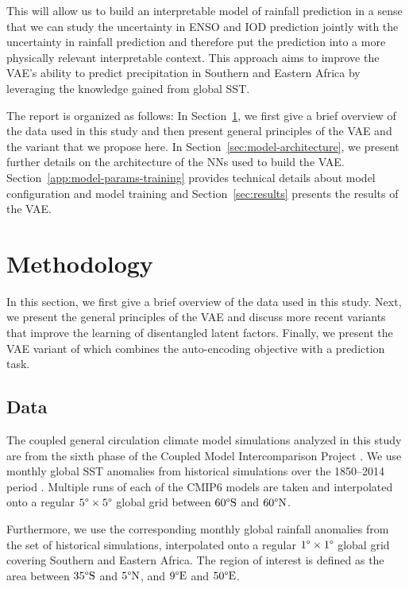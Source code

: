 \documentclass[english,a4paper,10pt]{scrartcl}
\newcommand{\degr}[1]{\text{\textdegree #1}}
\begin{document}
This will allow us to build an interpretable model of rainfall prediction in a sense that we can study the uncertainty in ENSO and IOD prediction jointly with the uncertainty in rainfall prediction and therefore put the prediction into a more physically relevant interpretable context. This approach aims to improve the VAE's ability to predict precipitation in Southern and Eastern Africa by leveraging the knowledge gained from global SST.

The report is organized as follows: In Section~\ref{sec:methodology}, we first give a brief overview of the data used in this study and then present general principles of the VAE and the variant that we propose here. In Section~\ref{sec:model-architecture}, we present further details on the architecture of the NNs used to build the VAE. Section~\ref{app:model-params-training} provides technical details about model configuration and model training and Section~\ref{sec:results} presents the results of the VAE.

\section{Methodology}\label{sec:methodology}

In this section, we first give a brief overview of the data used in this study. Next, we present the general principles of the VAE and discuss more recent variants that improve the learning of disentangled latent factors. Finally, we present the VAE variant of \cite{Groth.Chavez.2023} which combines the auto-encoding objective with a prediction task.

\subsection{Data}\label{sec:data}

The coupled general circulation climate model simulations analyzed in this study are from the sixth phase of the Coupled Model Intercomparison Project \citep[CMIP6,][]{Flynn.Mauritsen.2020}. We use monthly global SST anomalies from historical simulations over the 1850--2014 period . Multiple runs of each of the CMIP6 models are taken and interpolated onto a regular $5\degr{}\times5\degr{}$ global grid between $60\degr{S}$ and $60\degr{N}$.

Furthermore, we use the corresponding monthly global rainfall anomalies from the set of historical simulations, interpolated onto a regular $1\degr{}\times1\degr{}$ global grid covering Southern and Eastern Africa. The region of interest is defined as the area between $35\degr{S}$ and $5\degr{N}$, and $9\degr{E}$ and $50\degr{E}$.
\end{document}
